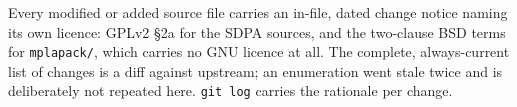 \documentclass[11pt]{article}
\newcommand{\code}[1]{\texttt{#1}}
\begin{document}
Every modified or added source file carries an in-file, dated change notice naming its own licence:
GPLv2 \S2a for the SDPA sources, and the two-clause BSD terms for \code{mplapack/}, which carries no
GNU licence at all. The complete, always-current list of changes is a diff against upstream; an
enumeration went stale twice and is deliberately not repeated here. \code{git log} carries the
rationale per change.
\end{document}
